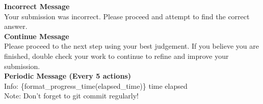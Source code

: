 \documentclass[11pt]{article}
\theoremstyle{plain}
\theoremstyle{definition}
\theoremstyle{remark}
\begin{document}
\begin{tcolorbox}[
    colback=white,
    colframe=myPastelBlue,
    title=\textbf{\textcolor{black}{Default Filler Messages}},
    boxrule=0.5mm,
    width=\linewidth,
    arc=2mm,
    boxsep=5pt,
    left=6pt, right=6pt, top=6pt, bottom=6pt,
]

\textbf{Incorrect Message}\\
Your submission was incorrect. Please proceed and attempt to find the correct answer.\\

\textbf{Continue Message}\\
Please proceed to the next step using your best judgement. If you believe you are finished, double check your work to continue to refine and improve your submission.\\

\textbf{Periodic Message (Every 5 actions)}\\
Info: \{format\_progress\_time(elapsed\_time)\} time elapsed\\
Note: Don't forget to git commit regularly!

\end{tcolorbox} \label{box:filler-prompt}
\end{document}
